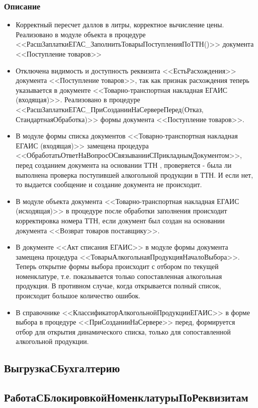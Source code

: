 \subsubsection{Описание}
\begin{itemize}[label={--}]
	\item Корректный пересчет даллов в литры, корректное вычисление цены. Реализовано в модуле объекта в процедуре <<РасшЗаплаткиЕГАС\_ЗаполнитьТоварыПоступленияПоТТН()>> документа <<Поступление товаров>>
	\item Отключена видимость и доступность реквизита <<ЕстьРасхождения>>  документа <<Поступление товаров>>, так как признак расхождения теперь указывается в документе <<Товарно-транспортная накладная ЕГАИС (входящая)>>. Реализовано в процедуре <<РасшЗаплаткиЕГАС\_ПриСозданииНаСервереПеред(Отказ, СтандартнаяОбработка)>> формы документа <<Поступление товаров>>.
	\item В модуле формы списка документов <<Товарно-транспортная накладная ЕГАИС (входящая)>> замещена процедура <<ОбработатьОтветНаВопросОСвязыванииСПрикладнымДокументом>>, 	перед созданием документа на основании ТТН , проверяется - была ли выполнена проверка поступившей алкогольной продукции в ТТН. И если нет, то выдается сообщение и создание документа не происходит.
	\item В модуле объекта документа <<Товарно-транспортная накладная ЕГАИС (исходящая)>> в процедуре после обработки заполнения происходит корректировка номера ТТН, если документ был создан на основании документа <<Возврат товаров поставщику>>.
	\item В документе <<Акт списания ЕГАИС>> в модуле формы документа замещена процедура <<ТоварыАлкогольнаяПродукцияНачалоВыбора>>. Теперь открытие формы выбора происходит с отбором по текущей номенклатуре, т.е. показывается только сопоставленная алкогольная продукция. В противном случае, когда открывается полный список, происходит большое количество ошибок.
	\item В справочнике <<КлассификаторАлкогольнойПродукцииЕГАИС>> в форме выбора в процедуре <<ПриСозданииНаСервере>> перед, формируется отбор для открытия динамического списка, только для сопоставленной алкогольной продукции.
\end{itemize}
\subsection{ВыгрузкаСБухгалтерию}\label{502}
\subsection{РаботаСБлокировкойНоменклатурыПоРеквизитам}\label{503}
